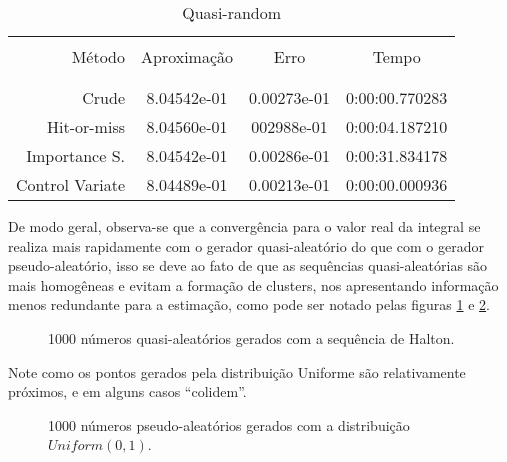 \documentclass[twocolumn,amsmath,amssymb,floatfix]{revtex4}
\begin{document}
\begin{table}[h!]
\centering
\caption{Quasi-random}
\begin{tabular}{rccc}\hline\hline\\
 Método & Aproximação & Erro & Tempo\\\\
	\hline\hline
	\\
  Crude &  8.04542e-01 & 0.00273e-01 & 0:00:00.770283 \\
  Hit-or-miss &  8.04560e-01 & 002988e-01 & 0:00:04.187210 \\
  Importance S. &  8.04542e-01 & 0.00286e-01 &  0:00:31.834178 \\
  Control Variate &  8.04489e-01 & 0.00213e-01 & 0:00:00.000936\\
		\hline\hline
\end{tabular}
\label{tabrquasiresults}
\end{table}


De modo geral, observa-se que a convergência para o valor real da integral se realiza mais rapidamente com o gerador quasi-aleatório do que com o gerador pseudo-aleatório, isso se deve ao fato de que as sequências quasi-aleatórias são mais homogêneas e evitam a formação de clusters, nos apresentando informação menos redundante para a estimação, como pode ser notado pelas figuras \ref{fig:grafico-quasi} e \ref{fig:grafico-uniforme}.


\begin{figure}[H]

\caption{1000 números quasi-aleatórios gerados com a sequência de Halton.}
\label{fig:grafico-quasi}
\end{figure}



Note como os pontos gerados pela distribuição Uniforme são relativamente próximos, e em alguns casos ``colidem''.

\begin{figure}[H]

\caption{1000 números pseudo-aleatórios gerados com a distribuição $Uniform(0,1)$.}
\label{fig:grafico-uniforme}
\end{figure}
\end{document}

